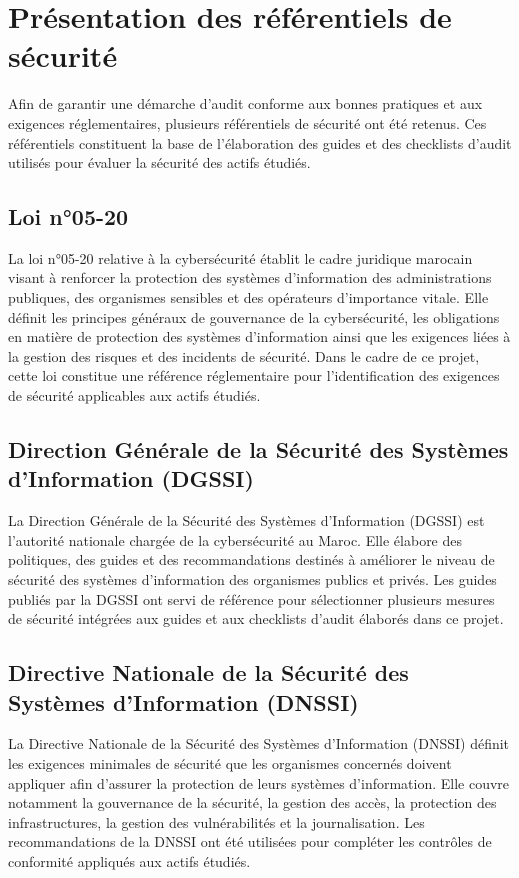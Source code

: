 \section{Présentation des référentiels de sécurité}

Afin de garantir une démarche d'audit conforme aux bonnes pratiques et aux exigences réglementaires, plusieurs référentiels de sécurité ont été retenus. Ces référentiels constituent la base de l'élaboration des guides et des checklists d'audit utilisés pour évaluer la sécurité des actifs étudiés.

\subsection{Loi n°05-20}

La loi n°05-20 relative à la cybersécurité établit le cadre juridique marocain visant à renforcer la protection des systèmes d'information des administrations publiques, des organismes sensibles et des opérateurs d'importance vitale. Elle définit les principes généraux de gouvernance de la cybersécurité, les obligations en matière de protection des systèmes d'information ainsi que les exigences liées à la gestion des risques et des incidents de sécurité. Dans le cadre de ce projet, cette loi constitue une référence réglementaire pour l'identification des exigences de sécurité applicables aux actifs étudiés.

\subsection{Direction Générale de la Sécurité des Systèmes d'Information (DGSSI)}

La Direction Générale de la Sécurité des Systèmes d'Information (DGSSI) est l'autorité nationale chargée de la cybersécurité au Maroc. Elle élabore des politiques, des guides et des recommandations destinés à améliorer le niveau de sécurité des systèmes d'information des organismes publics et privés. Les guides publiés par la DGSSI ont servi de référence pour sélectionner plusieurs mesures de sécurité intégrées aux guides et aux checklists d'audit élaborés dans ce projet.

\subsection{Directive Nationale de la Sécurité des Systèmes d'Information (DNSSI)}

La Directive Nationale de la Sécurité des Systèmes d'Information (DNSSI) définit les exigences minimales de sécurité que les organismes concernés doivent appliquer afin d'assurer la protection de leurs systèmes d'information. Elle couvre notamment la gouvernance de la sécurité, la gestion des accès, la protection des infrastructures, la gestion des vulnérabilités et la journalisation. Les recommandations de la DNSSI ont été utilisées pour compléter les contrôles de conformité appliqués aux actifs étudiés.

